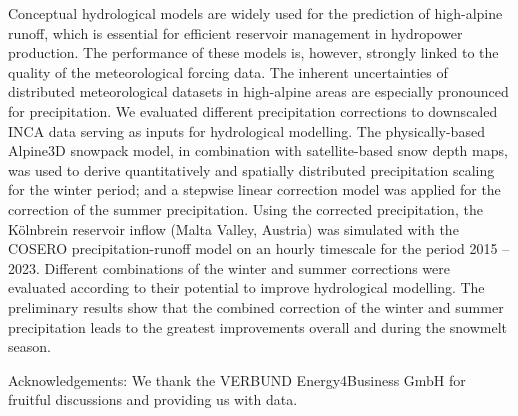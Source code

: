 \noindent

Conceptual hydrological models are widely used for the prediction of high-alpine runoff, which is essential for efficient reservoir management in hydropower production. The performance of these models is, however, strongly linked to the quality of the meteorological forcing data. The inherent uncertainties of distributed meteorological datasets in high-alpine areas are especially pronounced for precipitation. We evaluated different precipitation corrections to downscaled INCA data serving as inputs for hydrological modelling. The physically-based Alpine3D snowpack model, in combination with satellite-based snow depth maps, was used to derive quantitatively and spatially distributed precipitation scaling for the winter period; and a stepwise linear correction model was applied for the correction of the summer precipitation. Using the corrected precipitation, the Kölnbrein reservoir inflow (Malta Valley, Austria) was simulated with the COSERO precipitation-runoff model on an hourly timescale for the period 2015 – 2023. Different combinations of the winter and summer corrections were evaluated according to their potential to improve hydrological modelling. The preliminary results show that the combined correction of the winter and summer precipitation leads to the greatest improvements overall and during the snowmelt season.

Acknowledgements: We thank the VERBUND Energy4Business GmbH for fruitful discussions and providing us with data.
\newpage{}
{}
\begin{flushleft}





\end{flushleft}

\noindent

